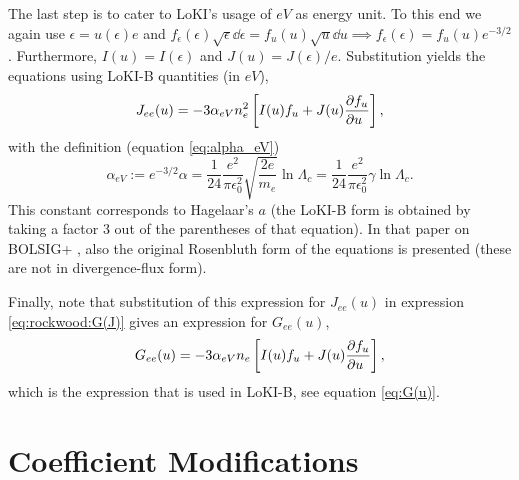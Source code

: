 \documentclass{book}
\begin{document}
The last step is to cater to LoKI's usage of $\si{eV}$ as energy unit. To this end we again
use $\epsilon = u(\epsilon)e$ and $f_\epsilon(\epsilon)\sqrt{\epsilon}\dd{\epsilon}
= f_u(u)\sqrt{u}\dd{u} \implies f_\epsilon(\epsilon) = f_u(u)e^{-3/2}$.
Furthermore, $I(u)=I(\epsilon)$ and $J(u)=J(\epsilon)/e$. Substitution yields the
equations using LoKI-B quantities (in $\si{eV}$),
\begin{equation}
  J_{ee}(u) = -3\alpha_{eV} n_e^2 \left[I(u)f_u + J(u)\PDEV{f_u}{u}\right],
\end{equation}
with the definition (equation \eqref{eq:alpha_eV})
\[
	\alpha_{eV}
	:= e^{-3/2}\alpha
	= \frac{1}{24}\frac{e^2}{\pi\epsilon_0^2}\sqrt{\frac{2e}{m_e}}\ln\Lambda_c
	= \frac{1}{24}\frac{e^2}{\pi\epsilon_0^2}\gamma\ln\Lambda_c.
\]
This constant corresponds to Hagelaar's $a$ \cite[eq. 38]{Hagelaar2005} (the LoKI-B form is
obtained by taking a factor 3 out of the parentheses of that equation). In that paper
on BOLSIG+ \cite[eq. 32-37]{Hagelaar2005}, also the original Rosenbluth form
\cite[eq. B1--3]{Rockwood1973}\cite{Rosenbluth1957} of the equations is presented
(these are not in divergence-flux form).

Finally, note that substitution of this expression for $J_{ee}(u)$ in expression
\eqref{eq:rockwood:G(J)} gives an expression for $G_{ee}(u)$,
\[
	G_{ee}(u) = -3\alpha_{eV} n_e \left[I(u)f_u + J(u)\PDEV{f_u}{u}\right],
\]
which is the expression that is used in LoKI-B, see equation \eqref{eq:G(u)}.

\section{Coefficient Modifications}
\label{sec:Rockwood-mods}
\end{document}

